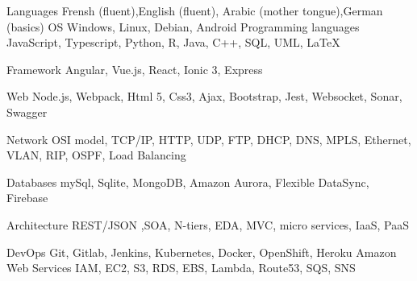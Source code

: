 

\begin{cvskills}
  \cvskill
    {Languages } %
    {Frensh  (fluent),English (fluent), Arabic (mother tongue),German (basics)} %
  \cvskill
    {OS} %
    {Windows, Linux, Debian, Android} %
  \cvskill
    {Programming languages} %
    {JavaScript, Typescript, Python, R, Java, C++, SQL, UML, LaTeX} %

  \cvskill
    {Framework} %
    {Angular, Vue.js, React, Ionic 3, Express} %
    

  \cvskill
    {Web} %
    {Node.js, Webpack, Html 5, Css3, Ajax, Bootstrap, Jest, Websocket, Sonar, Swagger} %



  \cvskill
    {Network} %
    {OSI model, TCP/IP, HTTP, UDP, FTP, DHCP, DNS, MPLS, Ethernet, VLAN, RIP, OSPF, Load Balancing   } %

  \cvskill
    {Databases} %
    {mySql, Sqlite, MongoDB, Amazon Aurora, Flexible DataSync, Firebase } %

  \cvskill
    {Architecture} %
    {REST/JSON ,SOA, N-tiers, EDA, MVC, micro services, IaaS, PaaS } %

  \cvskill
    {DevOps} %
    {Git, Gitlab, Jenkins, Kubernetes, Docker, OpenShift, Heroku  } %
\cvskill
    {Amazon Web Services} %
    {IAM, EC2, S3, RDS, EBS, Lambda, Route53, SQS, SNS  } %


\end{cvskills}

